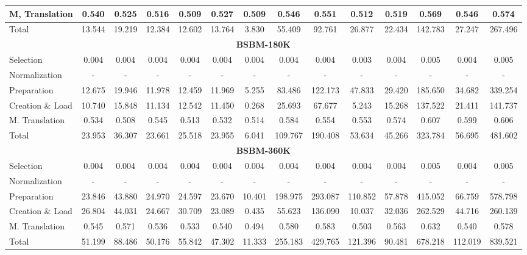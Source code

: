 \begin{table}[th]
{\begin{tabular}{l|c|c|c|c|c|c|c|c|c|c|c|c|c}
M, Translation & 0.540 & 0.525 & 0.516 & 0.509 & 0.527 & 0.509 & 0.546 & 0.551 & 0.512 & 0.519 & 0.569 & 0.546 & 0.574 \\ \hline
Total & 13.544 & 19.219 & 12.384 & 12.602 & 13.764 & 3.830 & 55.409 & 92.761 & 26.877 & 22.434 & 142.783 & 27.247 & 267.496 \\ \hline
\multicolumn{14}{c}{\textbf{BSBM-180K}} \\ \hline
Selection & 0.004 & 0.004 & 0.004 & 0.004 & 0.004 & 0.004 & 0.004 & 0.004 & 0.003 & 0.004 & 0.005 & 0.004 & 0.005 \\ \hline
Normalization & - & - & - & - & - & - & - & - & - & - & - & - & - \\ \hline
Preparation & 12.675 & 19.946 & 11.978 & 12.459 & 11.969 & 5.255 & 83.486 & 122.173 & 47.833 & 29.420 & 185.650 & 34.682 & 339.254 \\ \hline
Creation \& Load & 10.740 & 15.848 & 11.134 & 12.542 & 11.450 & 0.268 & 25.693 & 67.677 & 5.243 & 15.268 & 137.522 & 21.411 & 141.737 \\ \hline
M. Translation & 0.534 & 0.508 & 0.545 & 0.513 & 0.532 & 0.514 & 0.584 & 0.554 & 0.553 & 0.574 & 0.607 & 0.599 & 0.606 \\ \hline
Total & 23.953 & 36.307 & 23.661 & 25.518 & 23.955 & 6.041 & 109.767 & 190.408 & 53.634 & 45.266 & 323.784 & 56.695 & 481.602 \\ \hline
\multicolumn{14}{c}{\textbf{BSBM-360K}} \\ \hline
Selection & 0.004 & 0.004 & 0.004 & 0.004 & 0.004 & 0.004 & 0.004 & 0.004 & 0.004 & 0.004 & 0.005 & 0.004 & 0.005 \\ \hline
Normalization & - & - & - & - & - & - & - & - & - & - & - & - & - \\ \hline
Preparation & 23.846 & 43.880 & 24.970 & 24.597 & 23.670 & 10.401 & 198.975 & 293.087 & 110.852 & 57.878 & 415.052 & 66.759 & 578.798 \\ \hline
Creation \& Load & 26.804 & 44.031 & 24.667 & 30.709 & 23.089 & 0.435 & 55.623 & 136.090 & 10.037 & 32.036 & 262.529 & 44.716 & 260.139 \\ \hline
M. Translation & 0.545 & 0.571 & 0.536 & 0.533 & 0.540 & 0.494 & 0.580 & 0.583 & 0.503 & 0.563 & 0.632 & 0.540 & 0.578 \\ \hline
Total & 51.199 & 88.486 & 50.176 & 55.842 & 47.302 & 11.333 & 255.183 & 429.765 & 121.396 & 90.481 & 678.218 & 112.019 & 839.521 \\ \hline
\end{tabular}%
}
\end{table}

